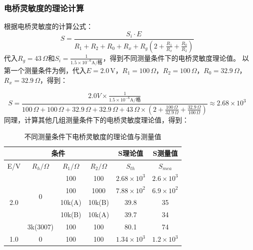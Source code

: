 \documentclass[12pt]{article}
\begin{document}
\subsubsection{电桥灵敏度的理论计算}
根据电桥灵敏度的计算公式：
\begin{equation*}
    S = \frac{S_i\cdot E}{R_1+R_2+R_0+R_x+R_g(2+\frac{R_1}{R_x}+\frac{R_0}{R_2})}
\end{equation*}
\quad 代入$R_g=43\,\Omega$和$S_i=\frac{1}{1.5\times10^{-6}\text{A/格}}$，得到不同测量条件下的电桥灵敏度理论值。
以第一个测量条件为例，代入$E=2.0\,\text{V}$，$R_1=100\,\Omega$，$R_2=100\,\Omega$，$R_0=32.9\,\Omega$，$R_x=32.9\,\Omega$，得到：

\begin{equation*}
    S = \frac{2.0V\times \frac{1}{1.5\times10^{-6}\text{A/格}}}{100\,\Omega+100\,\Omega+32.9\,\Omega+32.9\,\Omega+43\,\Omega\times(2+\frac{100\,\Omega}{32.9\,\Omega}+\frac{32.9\,\Omega}{100\,\Omega})} \approx 2.68\times10^3
\end{equation*}
同理，计算其他几组测量条件下的电桥灵敏度理论值，得到：
\begin{table}[H]
    \centering
    \begin{tabular}{|cccc|c|c|}
        \hline
        \multicolumn{4}{|c|}{条件} & \multicolumn{1}{c|}{S理论值} & \multicolumn{1}{c|}{S测量值} \\ \hline
        \multicolumn{1}{|c|}{E/V}                  & \multicolumn{1}{c|}{$R_h/\Omega$}       & \multicolumn{1}{c|}{$R_1/\Omega$} & $R_2/\Omega$ & $S_{th}$ & $S_{mea}$ \\ \hline
        \multicolumn{1}{|c|}{\multirow{5}{*}{2.0}} & \multicolumn{1}{c|}{\multirow{4}{*}{0}} & \multicolumn{1}{c|}{100}          & 100          & $2.68\times10^3$ & $2.6\times 10^3$ \\ \cline{3-6} 
        \multicolumn{1}{|c|}{}                     & \multicolumn{1}{c|}{}                   & \multicolumn{1}{c|}{100}          & 1000         & $7.88\times10^2$ & $6.9\times 10^2$ \\ \cline{3-6}
        \multicolumn{1}{|c|}{}                     & \multicolumn{1}{c|}{}                   & \multicolumn{1}{c|}{10k(A)}       & 10k(B)       & 39.8 & 35 \\ \cline{3-6}
        \multicolumn{1}{|c|}{}                     & \multicolumn{1}{c|}{}                   & \multicolumn{1}{c|}{10k(B)}       & 10k(A)       & 39.7 & 34 \\ \cline{2-6}
        \multicolumn{1}{|c|}{}                     & \multicolumn{1}{c|}{3k(3007)}           & \multicolumn{1}{c|}{100}          & 100          & 80.1 & 74 \\ \hline
        \multicolumn{1}{|c|}{1.0}                  & \multicolumn{1}{c|}{0}                  & \multicolumn{1}{c|}{100}          & 100          & $1.34\times10^3$ & $1.2\times 10^3$ \\ \hline
    \end{tabular}
    \caption{不同测量条件下电桥灵敏度的理论值与测量值}
\end{table}
\end{document}
